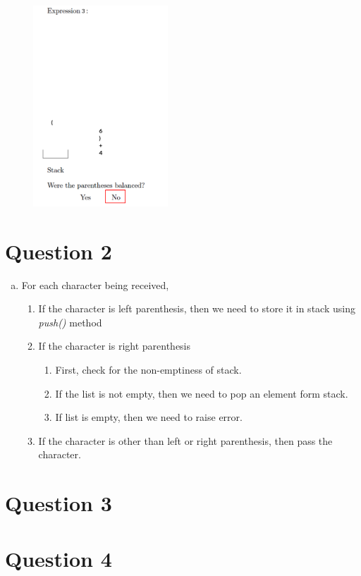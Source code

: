 \documentclass[12pt]{article}
\begin{document}
\begin{figure}[h!]
    \includegraphics[width=0.45\textwidth]{images/worksheet_9_q1c_solution.png}\hfill
\end{figure}

\newpage

\section*{Question 2}
\begin{enumerate}[a.]
    \item

    For each character being received,

    \begin{enumerate}[1.]
        \item If the character is left parenthesis, then we need to store it in stack using \textit{push()} method
        \item If the character is right parenthesis
        \begin{enumerate}[1.]
            \item First, check for the non-emptiness of stack.
            \item If the list is not empty, then we need to pop an element form stack.
            \item If list is empty, then we need to raise error.
        \end{enumerate}
        \item If the character is other than left or right parenthesis, then pass the character.
    \end{enumerate}
\end{enumerate}

\section*{Question 3}

\section*{Question 4}
\end{document}
